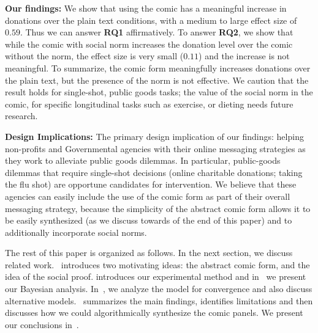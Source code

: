 \textbf{Our findings:} We show that using the comic has a meaningful increase in donations over the plain text conditions, with a medium to large effect size of $0.59$. Thus we can answer \textbf{RQ1} affirmatively. To answer \textbf{RQ2}, we show that while the comic with social norm increases the donation level over the comic without the norm, the effect size is very small ($0.11$) and the increase is not meaningful. To summarize, the comic form meaningfully increases donations over the plain text, but the presence of the norm is not effective. We caution that the result holds for single-shot, public goods tasks; the value of the social norm in the comic, for specific longitudinal tasks such as exercise, or dieting needs future research.  

\textbf{Design Implications:} The primary design implication of our findings: helping non-profits and Governmental agencies with their online messaging strategies as they work to alleviate public goods dilemmas. In particular, public-goods dilemmas that require single-shot decisions (online charitable donations; taking the flu shot) are opportune candidates for intervention. We believe that these agencies can easily include the use of the comic form as part of their overall messaging strategy, because the simplicity of the abstract comic form allows it to be easily synthesized (as we discuss towards of the end of this paper) and to additionally incorporate social norms. 


The rest of this paper is organized as follows. In the next section, we discuss related work.~ introduces two motivating ideas: the abstract comic form, and the idea of the social proof. introduces our experimental method and in~ we present our Bayesian analysis. In~, we analyze the model for convergence and also discuss alternative models.~ summarizes the main findings, identifies limitations and then discusses how we could algorithmically synthesize the comic panels. We present our conclusions in~. 






